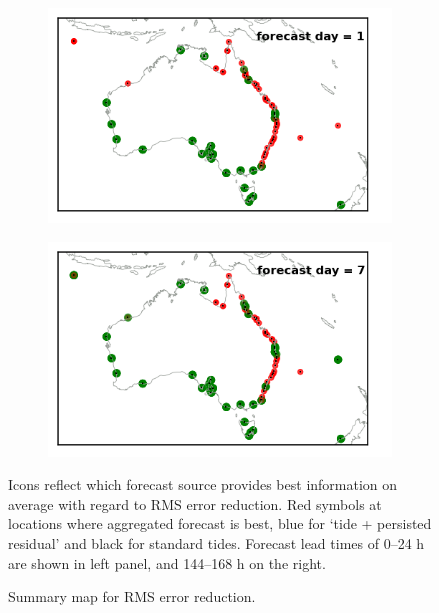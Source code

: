 \begin{figure}[!hbt] \centering
    \begin{subfigure}[b]{0.45\textwidth}
        \includegraphics[width=\textwidth]{figures/maps/plot_map_rms_score_day_1.png}
    \end{subfigure}
    \begin{subfigure}[b]{0.45\textwidth}
        \includegraphics[width=\textwidth]{figures/maps/plot_map_rms_score_day_7.png}
    \end{subfigure}
    \caption{Summary map for RMS error reduction.}{Icons reflect which forecast source provides best information on average with regard to RMS error reduction. Red symbols at locations where aggregated forecast is best, blue for `tide + persisted residual' and black for standard tides.  Forecast lead times of 0--24 h are shown in left panel, and 144--168 h on the right.}
    \label{fig:map_rms}
\end{figure}   


